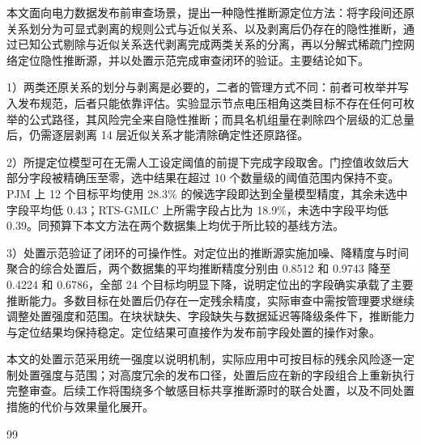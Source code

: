 \documentclass[UTF8,zihao=5,twoside]{ctexart}
\begin{document}
本文面向电力数据发布前审查场景，提出一种隐性推断源定位方法：将字段间还原关系划分为可显式剥离的规则公式与近似关系、以及剥离后仍存在的隐性推断，通过已知公式剔除与近似关系迭代剥离完成两类关系的分离，再以分解式稀疏门控网络定位隐性推断源，并以处置示范完成审查闭环的验证。主要结论如下。

1）两类还原关系的划分与剥离是必要的，二者的管理方式不同：前者可枚举并写入发布规范，后者只能依靠评估。实验显示节点电压相角这类目标不存在任何可枚举的公式路径，其风险完全来自隐性推断；而具名机组量在剥除四个层级的汇总量后，仍需逐层剥离 14 层近似关系才能清除确定性还原路径。

2）所提定位模型可在无需人工设定阈值的前提下完成字段取舍。门控值收敛后大部分字段被精确压至零，选中结果在超过 10 个数量级的阈值范围内保持不变。PJM 上 12 个目标平均使用 28.3\% 的候选字段即达到全量模型精度，其余未选中字段平均低 0.43；RTS-GMLC 上所需字段占比为 18.9\%，未选中字段平均低 0.39。同预算下本文方法在两个数据集上均优于所比较的基线方法。

3）处置示范验证了闭环的可操作性。对定位出的推断源实施加噪、降精度与时间聚合的综合处置后，两个数据集的平均推断精度分别由 0.8512 和 0.9743 降至 0.4224 和 0.6786，全部 24 个目标均明显下降，说明定位出的字段确实承载了主要推断能力。多数目标在处置后仍存在一定残余精度，实际审查中需按管理要求继续调整处置强度和范围。在块状缺失、字段缺失与数据延迟等降级条件下，推断能力与定位结果均保持稳定。定位结果可直接作为发布前字段处置的操作对象。

本文的处置示范采用统一强度以说明机制，实际应用中可按目标的残余风险逐一定制处置强度与范围；对高度冗余的发布口径，处置后应在新的字段组合上重新执行完整审查。后续工作将围绕多个敏感目标共享推断源时的联合处置，以及不同处置措施的代价与效果量化展开。

\begin{thebibliography}{99}

\end{thebibliography}

\vspace{0.6em}
\end{document}
